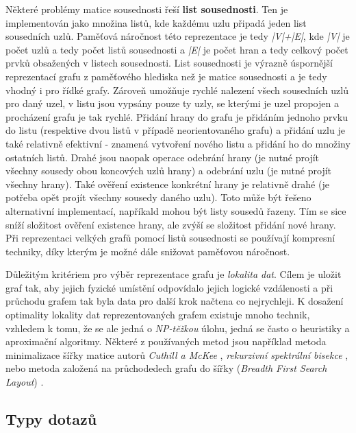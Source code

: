Některé problémy matice sousednosti řeší \textbf{list sousednosti}. Ten je implementován jako množina listů, kde každému uzlu připadá jeden list sousedních uzlů. Paměťová náročnost této reprezentace je tedy \textit{|V|+|E|}, kde \textit{|V|} je počet uzlů a tedy počet listů sousednosti a \textit{|E|} je počet hran a tedy celkový počet prvků obsažených v listech sousednosti. List sousednosti je výrazně úspornější reprezentací grafu z paměťového hlediska než je matice sousednosti a je tedy vhodný i pro řídké grafy. Zároveň umožňuje rychlé nalezení všech sousedních uzlů pro daný uzel, v listu jsou vypsány pouze ty uzly, se kterými je uzel propojen a procházení grafu je tak rychlé. Přidání hrany do grafu je přidáním jednoho prvku do listu (respektive dvou listů v případě neorientovaného grafu) a přidání uzlu je také relativně efektivní - znamená vytvoření nového listu a přidání ho do množiny ostatních listů. Drahé jsou naopak operace odebrání hrany (je nutné projít všechny sousedy obou koncových uzlů hrany) a odebrání uzlu (je nutné projít všechny hrany). Také ověření existence konkrétní hrany je relativně drahé (je potřeba opět projít všechny sousedy daného uzlu). Toto může být řešeno alternativní implementací, napříkald mohou být listy sousedů řazeny. Tím se sice sníží složitost ověření existence hrany, ale zvýší se složitost přidání nové hrany.
Při reprezentaci velkých grafů pomocí listů sousednosti se používají kompresní techniky, díky kterým je možné dále snižovat paměťovou náročnost.\cite{Boldi04} 



Důležitým kritériem pro výběr reprezentace grafu je \textit{lokalita dat}. Cílem je uložit graf tak, aby jejich fyzické umístění odpovídalo jejich logické vzdálenosti a při průchodu grafem tak byla data pro další krok načtena co nejrychleji. K dosažení optimality lokality dat reprezentovaných grafem existuje mnoho technik, vzhledem k tomu, že se ale jedná o \textit{NP-těžkou} úlohu, jedná se často o heuristiky a aproximační algoritmy. Některé z používaných metod jsou například metoda minimalizace šířky matice autorů \textit{Cuthill a McKee} \cite{Cuthill69}, \textit{rekurzivní spektrální bisekce} \cite{Barnard93}, nebo metoda založená na průchodedech grafu do šířky (\textit{Breadth First Search Layout}) \cite{Furaih98}.


\subsection{Typy dotazů}
\label{sec:gdb-dotazy}

